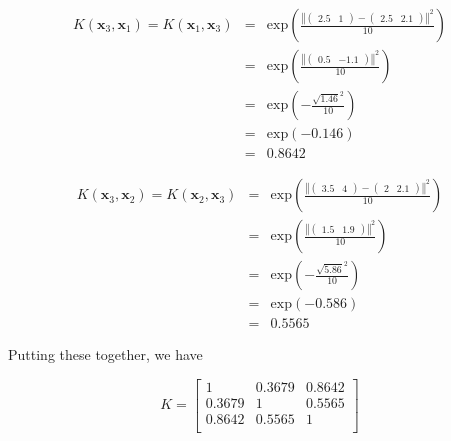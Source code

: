 \documentclass[11pt]{article}
\begin{document}
\begin{enumerate}
\begin{enumerate}
\begin{eqnarray*}
K(\mathbf{x}_3, \mathbf{x}_1) = K(\mathbf{x}_1, \mathbf{x}_3) &=& \text{exp} \left( \frac{\left \Vert \left( \begin{array}{cc} 2.5 & 1 \end{array} \right) - \left( \begin{array}{cc} 2.5 & 2.1 \end{array} \right) \right \Vert^2}{10} \right) \\ \nonumber
&=& \text{exp} \left( \frac{\left \Vert \left( \begin{array}{cc} 0.5 & -1.1 \end{array} \right) \right \Vert^2}{10} \right) \\ \nonumber
&=& \text{exp} \left( - \frac{\sqrt{1.46}^2}{10} \right) \\ \nonumber
&=& \text{exp} \left( -0.146 \right) \\ \nonumber
&=& 0.8642
\end{eqnarray*}

\begin{eqnarray*}
K(\mathbf{x}_3, \mathbf{x}_2) = K(\mathbf{x}_2, \mathbf{x}_3) &=& \text{exp} \left( \frac{\left \Vert \left( \begin{array}{cc} 3.5 & 4 \end{array} \right) - \left( \begin{array}{cc} 2 & 2.1 \end{array} \right) \right \Vert^2}{10} \right) \\ \nonumber
&=& \text{exp} \left( \frac{\left \Vert \left( \begin{array}{cc} 1.5 & 1.9 \end{array} \right) \right \Vert^2}{10} \right) \\ \nonumber
&=& \text{exp} \left( - \frac{\sqrt{5.86}^2}{10} \right) \\ \nonumber
&=& \text{exp} \left( -0.586 \right) \\ \nonumber
&=& 0.5565
\end{eqnarray*}

Putting these together, we have

\begin{equation*}
K = \left[ \begin{array}{ccc}
1 & 0.3679 & 0.8642 \\
0.3679 & 1 & 0.5565 \\
0.8642 & 0.5565 & 1 \\
\end{array} \right]
\end{equation*}


\end{enumerate}
\end{enumerate}
\end{document}
